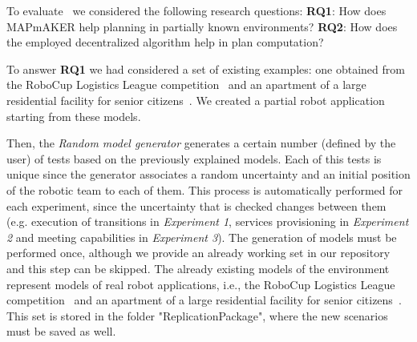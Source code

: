 To evaluate  \toolName\ we considered the following research questions: \textbf{RQ1}: How does MAPmAKER help planning in partially known environments? \textbf{RQ2}: How does the employed decentralized algorithm help in plan computation?

To answer \textbf{RQ1} we  had considered a set of existing examples:
one obtained from the RoboCup Logistics League competition~\cite{karrasrobocup} and an apartment of a large residential facility for senior citizens~\cite{map}.
We created a partial robot application starting from these models.


Then, the \emph{Random model generator} generates a certain number (defined by the user) of tests based on the previously explained models.
Each of this tests is unique since the generator associates a random uncertainty and an initial position of the robotic team to each of them.
This process is automatically performed for each experiment, since the uncertainty that is checked changes between them (e.g. execution of transitions in \emph{Experiment 1}, services provisioning in \emph{Experiment 2} and meeting capabilities in \emph{Experiment 3}).
The generation of models must be performed once, although we provide an already working set in our repository and this step can be skipped.
The already existing models of the environment represent models of real robot applications, i.e., the RoboCup Logistics League competition~\cite{karrasrobocup} and an apartment of a large residential facility for senior citizens~\cite{map}.
This set is stored in the folder "ReplicationPackage", where the new scenarios must be saved as well.


